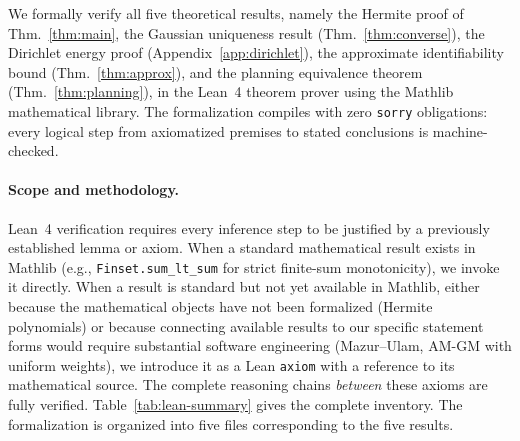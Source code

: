 We formally verify all five theoretical results, namely the Hermite proof of Thm.~\ref{thm:main}, the Gaussian uniqueness result (Thm.~\ref{thm:converse}), the Dirichlet energy proof (Appendix~\ref{app:dirichlet}), the approximate identifiability bound (Thm.~\ref{thm:approx}), and the planning equivalence theorem (Thm.~\ref{thm:planning}), in the Lean~4 theorem prover using the Mathlib mathematical library. The formalization compiles with zero \texttt{sorry} obligations: every logical step from axiomatized premises to stated conclusions is machine-checked.

\paragraph{Scope and methodology.}
Lean~4 verification requires every inference step to be justified by a previously established lemma or axiom. When a standard mathematical result exists in Mathlib (e.g., \texttt{Finset.sum\_lt\_sum} for strict finite-sum monotonicity), we invoke it directly. When a result is standard but not yet available in Mathlib, either because the mathematical objects have not been formalized (Hermite polynomials) or because connecting available results to our specific statement forms would require substantial software engineering (Mazur--Ulam, AM-GM with uniform weights), we introduce it as a Lean \texttt{axiom} with a reference to its mathematical source. The complete reasoning chains \emph{between} these axioms are fully verified.
Table~\ref{tab:lean-summary} gives the complete inventory.
The formalization is organized into five files corresponding to the five results.

